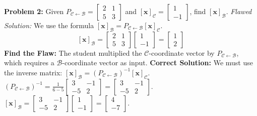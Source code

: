 \documentclass[11pt]{article}
\begin{document}
\textbf{Problem 2:} Given $P_{\mathcal{C} \leftarrow \mathcal{B}} = \begin{bmatrix} 2 & 1 \\ 5 & 3 \end{bmatrix}$ and $[\mathbf{x}]_{\mathcal{C}} = \begin{bmatrix} 1 \\ -1 \end{bmatrix}$, find $[\mathbf{x}]_{\mathcal{B}}$.
\textit{Flawed Solution:} We use the formula $[\mathbf{x}]_{\mathcal{B}} = P_{\mathcal{C} \leftarrow \mathcal{B}} [\mathbf{x}]_{\mathcal{C}}$.
\[ [\mathbf{x}]_{\mathcal{B}} = \begin{bmatrix} 2 & 1 \\ 5 & 3 \end{bmatrix} \begin{bmatrix} 1 \\ -1 \end{bmatrix} = \begin{bmatrix} 1 \\ 2 \end{bmatrix} \]
\textbf{Find the Flaw:} The student multiplied the $\mathcal{C}$-coordinate vector by $P_{\mathcal{C} \leftarrow \mathcal{B}}$, which requires a $\mathcal{B}$-coordinate vector as input.
\textbf{Correct Solution:} We must use the inverse matrix: $[\mathbf{x}]_{\mathcal{B}} = (P_{\mathcal{C} \leftarrow \mathcal{B}})^{-1} [\mathbf{x}]_{\mathcal{C}}$.
$(P_{\mathcal{C} \leftarrow \mathcal{B}})^{-1} = \frac{1}{6-5} \begin{bmatrix} 3 & -1 \\ -5 & 2 \end{bmatrix} = \begin{bmatrix} 3 & -1 \\ -5 & 2 \end{bmatrix}$.
$[\mathbf{x}]_{\mathcal{B}} = \begin{bmatrix} 3 & -1 \\ -5 & 2 \end{bmatrix} \begin{bmatrix} 1 \\ -1 \end{bmatrix} = \begin{bmatrix} 4 \\ -7 \end{bmatrix}$.

\vspace{0.5cm}
\end{document}

